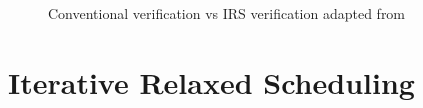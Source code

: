 \begin{figure}[h]
     \caption{Conventional verification vs IRS verification adapted from \citet{metzler2017quick}}
\end{figure}


\section{Iterative Relaxed Scheduling \label{iter_rel_sched}}

